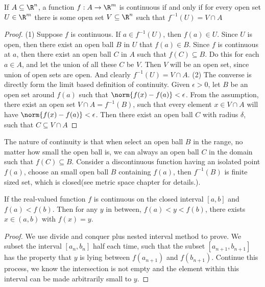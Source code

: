 \begin{refsection}
\begin{theorem}
\cite[12]{spivak} If $A\subseteq \R^n$, a function $f:A\to \R^m$ is continuous if and only if for every open set $U\in \R^m$ there is some open set $V\subseteq \R^n$ such that $f^{-1}(U) = V\cap A$
\end{theorem}
\begin{proof}
(1) Suppose $f$ is continuous. If $a\in f^{-1}(U)$, then $f(a) \in U$. Since $U$ is open, then there exist an open ball $B$ in $U$ that $f(a)\in B$. Since $f$ is continuous at $a$, then there exist an open ball $C$ in $A$ such that $f(C) \subseteq B$. Do this for each $a\in A$, and let the union of all these $C$ be $V$. Then $V$ will be an open set, since union of open sets are open. And clearly $f^{-1}(U) = V\cap A$. (2) The converse is directly form the limit based definition of continuity. Given $\epsilon > 0$, let $B$ be an open set around $f(a)$ such that $\norm{f(x)-f(a)} < \epsilon$. From the assumption, there exist an open set $V\cap A = f^{-1}(B)$, such that every element $x\in V\cap A$ will have $\norm{f(x)-f(a)} < \epsilon$. Then there exist an open ball $C$ with radius $\delta$, such that $C\subseteq V\cap A$	
\end{proof}



\begin{remark}
The nature of continuity is that when select an open ball $B$ in the range, no matter how small the open ball is, we can always an open ball $C$ in the domain such that $f(C) \subseteq B$. Consider a discontinuous function having an isolated point $f(a)$, choose an small open ball $B$ containing $f(a)$, then $f^{-1}(B)$ is finite sized set, which is closed(see metric space chapter for details.).    
\end{remark}

\begin{theorem}\label{ch:calculus:th:intermediatevaluetheoremonrealline}\cite[63]{fitzpatrick2006advanced}
	If the real-valued function $f$ is continuous on the closed interval $[a, b]$ and $f(a) < f(b)$. Then for any $y$ in between, $f(a) < y < f(b)$, there exists $x\in (a,b)$ with $f(x) = y$.
\end{theorem}
\begin{proof}
	We use divide and conquer plus nested interval method to prove. We subset the interval $[a_n,b_n]$ half each time, such that the subset $[a_{n+1},b_{n+1}]$ has the property that $y$ is lying between $f(a_{n+1})$ and $f(b_{n+1})$. Continue this process, we know the intersection is not empty and the element within this interval can be made arbitrarily small to $y$.
\end{proof}



\end{refsection}
